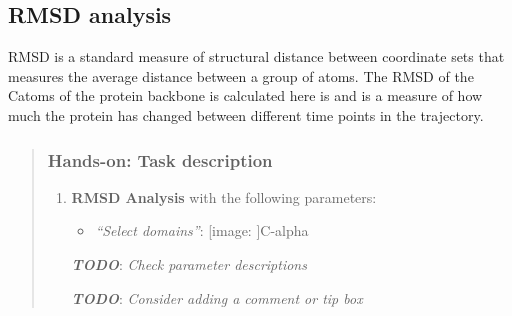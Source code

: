 \documentclass[twocolumn]{bmcart}%
\def\texttt{[image: ]}
\providecommand{\tightlist}{%
  \setlength{\itemsep}{0pt}\setlength{\parskip}{0pt}}
\begin{document}
\hypertarget{rmsd-analysis}{%
\subsection{RMSD analysis}\label{rmsd-analysis}}

RMSD is a standard measure of structural distance between coordinate
sets that measures the average distance between a group of atoms. The
RMSD of the C\alpha atoms of the protein backbone is calculated here is and
is a measure of how much the protein has changed between different time
points in the trajectory.

\begin{quote}
\hypertarget{hands-on-task-description-9}{%
\subsubsection{Hands-on: Task
description}\label{hands-on-task-description-9}}

\begin{enumerate}
\def\labelenumi{\arabic{enumi}.}
\tightlist
\item
  \textbf{RMSD Analysis} with the following parameters:

  \begin{itemize}
  \tightlist
  \item
    \emph{``Select domains''}: \texttt{C-alpha}
  \end{itemize}

  \textbf{\emph{TODO}}: \emph{Check parameter descriptions}

  \textbf{\emph{TODO}}: \emph{Consider adding a comment or tip box}
\end{enumerate}


\end{quote}
\end{document}
